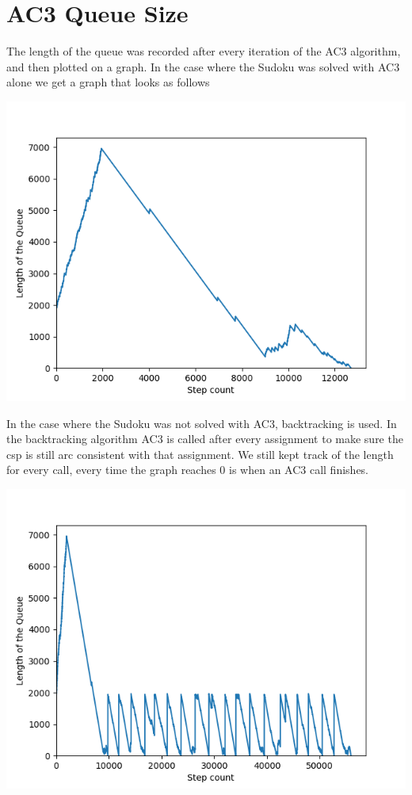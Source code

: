 \documentclass{article}
\begin{document}
\section{AC3 Queue Size}

The length of the queue was recorded after every iteration of the AC3 algorithm, and then plotted on a graph.
\newline
In the case where the Sudoku was solved with AC3 alone we get a graph that looks as follows

\includegraphics[scale=0.6]{Sudoku-Queue-length-plot-29}

In the case where the Sudoku was not solved with AC3, backtracking is used. In the backtracking algorithm AC3 is called after every assignment to make sure the csp is still arc consistent with that assignment. We still kept track of the length for every call, every time the graph reaches 0 is when an AC3 call finishes.

\includegraphics[scale=0.6]{Sudoku-Queue-length-plot-10}
\end{document}
